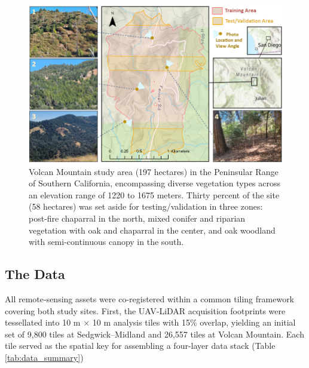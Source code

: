 \documentclass[remotesensing,article,submit,pdftex,moreauthors]{Definitions/mdpi}
\begin{document}
\begin{figure}[!t]
    \centering
    \includegraphics[width=1\linewidth]{manuscript/figures/Volcan_Mtn_Study_Area.png}
    \caption{Volcan Mountain study area (197 hectares) in the Peninsular Range of Southern California, encompassing diverse vegetation types across an elevation range of 1220 to 1675 meters. Thirty percent of the site (58 hectares) was set aside for testing/validation in three zones: post-fire chaparral in the north, mixed conifer and riparian vegetation with oak and chaparral in the center, and oak woodland with semi-continuous canopy in the south. }
    \label{fig:volcan_mtn_study_area}
\end{figure}






\subsection{The Data}

All remote‐sensing assets were co-registered within a common tiling framework covering both study sites.
First, the UAV‐LiDAR acquisition footprints were tessellated into 10 m × 10 m analysis tiles with 15\% overlap, yielding an initial set of 9,800 tiles at Sedgwick–Midland and 26,557 tiles at Volcan Mountain.  Each tile served as the spatial key for assembling a four-layer data stack (Table \ref{tab:data_summary})

\end{document}
